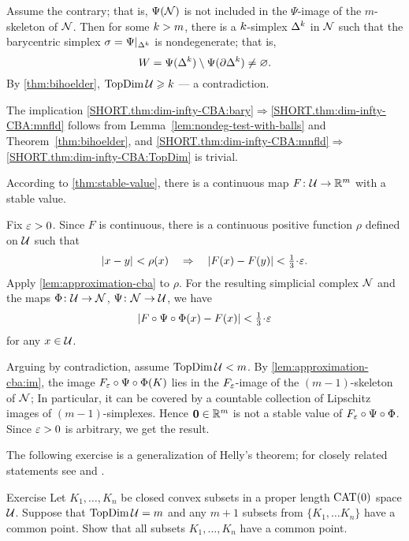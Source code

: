 Assume the contrary;
that is, $\Psi(\mathcal{N})$ is not included in the $\Psi$-image of the $m$-skeleton of $\mathcal{N}$.
Then for some $k>m$,
there is a $k$-simplex $\Delta^k$ in $\mathcal{N}$
such that the barycentric simplex $\sigma=\Psi|_{\Delta^k}$ is nondegenerate; 
that is, 
$$W=\Psi(\Delta^k)\setminus\Psi(\partial\Delta^k)\ne \varnothing.
$$
By \ref{thm:bihoelder}, $\mathop{\rm TopDim}\nolimits\mathcal{U}\geqslant k$ --- a contradiction.
\qeds

The implication \ref{SHORT.thm:dim-infty-CBA:bary}$\Rightarrow$\ref{SHORT.thm:dim-infty-CBA:mnfld} follows from Lemma~\ref{lem:nondeg-test-with-balls}
and Theorem~\ref{thm:bihoelder}, and \ref{SHORT.thm:dim-infty-CBA:mnfld}$\Rightarrow$\ref{SHORT.thm:dim-infty-CBA:TopDim} is trivial.
 
According to \ref{thm:stable-value}, 
there is a continuous map $F\colon\mathcal{U}\to \mathbb{R}^{m}$ with a stable value.

Fix $\varepsilon>0$.
Since $F$ is continuous, there is a continuous positive function $\rho$ defined on $\mathcal{U}$ such that 
\[\dist{x}{y}{}<\rho(x)
\quad\Rightarrow\quad
|F(x)- F(y)|<\tfrac13\cdot\eps.\]
Apply \ref{lem:approximation-cba} to $\rho$.
For the resulting simplicial complex $\mathcal{N}$ 
 and the maps $\Phi\colon\mathcal{U}\to \mathcal{N}$, $\Psi\colon\mathcal{N}\to \mathcal{U}$, we have
\[|F\circ \Psi\circ\map(x)-F(x)|<\tfrac13\cdot\eps\] 
for any $x\in \mathcal{U}$.

Arguing by contradiction,
assume $\mathop{\rm TopDim}\nolimits\mathcal{U}<m$.
By \ref{lem:approximation-cba:im},
the image $F_\varepsilon\circ\Psi\circ\Phi(K)$ lies in the $F_\varepsilon$-image of the $(m-1)$-skeleton of $\mathcal{N}$;
In particular, it can be covered by a countable collection of Lipschitz images of $(m-1)$-simplexes.
Hence
$\bm{0}\in \mathbb{R}^m$ is not a stable value of  $F_\varepsilon\circ\Psi\circ\Phi$.
Since $\varepsilon>0$ is arbitrary, we get the result.
\qeds

The following exercise is a generalization of Helly's theorem; for closely related statements see \cite[Prop. 5.3]{kleiner} and \cite{ivanov2014}.


\begin{thm}{Exercise}\label{ex:helly}
Let $K_1,\dots,K_n$ be closed convex subsets in a proper length $\mathrm{CAT}(0)$ space $\mathcal{U}$.
Suppose that $\mathop{\rm TopDim}\nolimits \mathcal{U}=m$ and any $m+1$ subsets from $\{K_1,\dots K_n\}$ have a common point.
Show that all subsets $K_1,\dots,K_n$ have a common point.
\end{thm}


